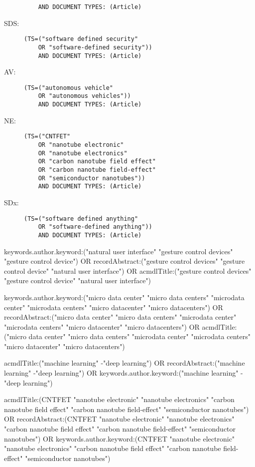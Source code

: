 \begin{description}
\begin{verbatim}
	AND DOCUMENT TYPES: (Article)\end{verbatim}
	\item[SDS:] \begin{verbatim}(TS=("software defined security"
	OR "software-defined security"))
	AND DOCUMENT TYPES: (Article)\end{verbatim}
	\item[AV:] \begin{verbatim}(TS=("autonomous vehicle"
	OR "autonomous vehicles"))
	AND DOCUMENT TYPES: (Article)\end{verbatim}
	\item[NE:] \begin{verbatim}(TS=("CNTFET"
	OR "nanotube electronic"
	OR "nanotube electronics"
	OR "carbon nanotube field effect"
	OR "carbon nanotube field-effect"
	OR "semiconductor nanotubes"))
	AND DOCUMENT TYPES: (Article)
	\end{verbatim}
	\item[SDx:] \begin{verbatim}(TS=("software defined anything"
	OR "software-defined anything"))
	AND DOCUMENT TYPES: (Article)\end{verbatim}
\end{description}

keywords.author.keyword:("natural user interface" "gesture control devices" "gesture control device") OR recordAbstract:("gesture control devices" "gesture control device" "natural user interface") OR acmdlTitle:("gesture control devices" "gesture control device" "natural user interface")

keywords.author.keyword:("micro data center" "micro data centers" "microdata center" "microdata centers" "micro datacenter" "micro datacenters") OR recordAbstract:("micro data center" "micro data centers" "microdata center" "microdata centers" "micro datacenter" "micro datacenters") OR acmdlTitle:("micro data center" "micro data centers" "microdata center" "microdata centers" "micro datacenter" "micro datacenters")

acmdlTitle:("machine learning" -"deep learning") OR recordAbstract:("machine learning" -"deep learning") OR keywords.author.keyword:("machine learning" -"deep learning")

acmdlTitle:(CNTFET "nanotube electronic" "nanotube electronics" "carbon nanotube field effect" "carbon nanotube field-effect" "semiconductor nanotubes") OR recordAbstract:(CNTFET "nanotube electronic" "nanotube electronics" "carbon nanotube field effect" "carbon nanotube field-effect" "semiconductor nanotubes") OR keywords.author.keyword:(CNTFET "nanotube electronic" "nanotube electronics" "carbon nanotube field effect" "carbon nanotube field-effect" "semiconductor nanotubes")


